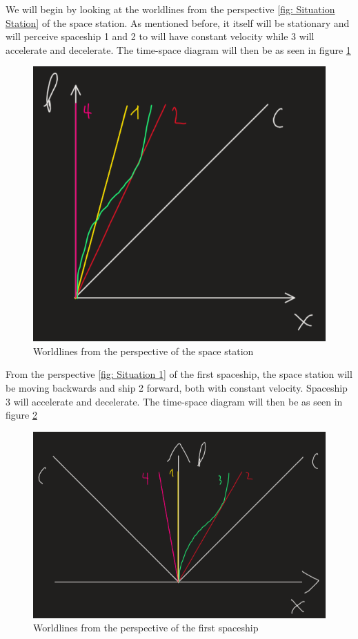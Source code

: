 \documentclass[reprint,english,notitlepage]{revtex4-2}
\begin{document}
  We will begin by looking at the worldlines from the perspective \ref{fig: Situation Station} of the space station. As mentioned before, it itself will be stationary and will perceive spaceship 1 and 2 to will have constant velocity while 3 will accelerate and decelerate. The time-space diagram will then be as seen in figure \ref{fig: Perspective Station}
  \begin{figure}[h!]
    \centering
    \includegraphics[scale = .5]{figures/4.2.1.png}
    \caption{Worldlines from the perspective of the space station}
    \label{fig: Perspective Station}
  \end{figure}
  
  From the perspective \ref{fig: Situation 1} of the first spaceship, the space station will be moving backwards and ship 2 forward, both with constant velocity. Spaceship 3 will accelerate and decelerate. The time-space diagram will then be as seen in figure \ref{fig: Perspective 1} 
  \begin{figure}[h!]
    \centering
    \includegraphics[scale = .5]{figures/4.2.2.png}
    \caption{Worldlines from the perspective of the first spaceship}
    \label{fig: Perspective 1}
  \end{figure}
  
\end{document}
